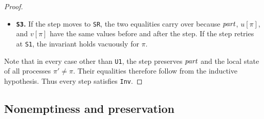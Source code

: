 \documentclass[12pt]{amsproc}
\begin{document}
\begin{enumerate}
\begin{proof}
\begin{itemize}
    \item \textbf{\texttt{S3}.}
    If the step moves to \texttt{SR}, the two equalities carry over because $\mathit{part}$, $u[\pi]$, and $v[\pi]$ have the same values before and after the step. If the step retries at \texttt{S1}, the invariant holds vacuously for $\pi$.

\end{itemize}

    Note that in every case other than \texttt{U1}, the step preserves $\mathit{part}$ and the local state of all processes $\pi'\ne\pi$. Their equalities therefore follow from the inductive hypothesis. Thus every step satisfies \texttt{Inv}.

\end{proof}
\end{enumerate}

\subsection{Nonemptiness and preservation}
\bbni
\end{document}
